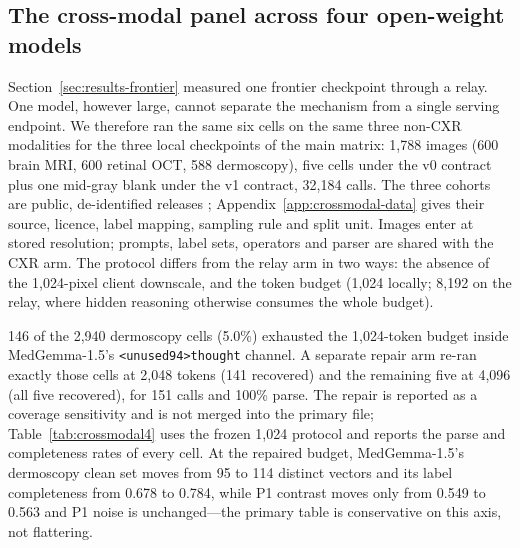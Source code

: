 \subsection{The cross-modal panel across four open-weight models}
\label{sec:results-crossmodal}

Section~\ref{sec:results-frontier} measured one frontier checkpoint through a relay. One
model, however large, cannot separate the mechanism from a single serving endpoint. We
therefore ran the same six cells on the same three non-CXR modalities for the three local
checkpoints of the main matrix: 1,788 images (600 brain MRI, 600 retinal OCT, 588
dermoscopy), five cells under the v0 contract plus one mid-gray blank under the v1
contract, 32,184 calls. The three cohorts are public, de-identified releases
\citep{cheng2017braintumor,kermany2018identifying,tschandl2018ham10000}; Appendix~\ref{app:crossmodal-data}
gives their source, licence, label mapping, sampling rule and split unit. Images enter at
stored resolution; prompts, label sets, operators
and parser are shared with the CXR arm. The protocol differs from the relay arm in two
ways: the absence of the 1,024-pixel client downscale, and the token budget (1,024
locally; 8,192 on the relay, where hidden reasoning otherwise consumes the whole budget).

146 of the 2,940 dermoscopy cells (5.0\%) exhausted the 1,024-token budget inside
MedGemma-1.5's \texttt{<unused94>thought} channel. A separate repair arm re-ran exactly
those cells at 2,048 tokens (141 recovered) and the remaining five at 4,096 (all five
recovered), for 151 calls and 100\% parse. The repair is reported as a coverage
sensitivity and is not merged into the primary file; Table~\ref{tab:crossmodal4} uses the
frozen 1,024 protocol and reports the parse and completeness rates of every cell. At the
repaired budget, MedGemma-1.5's dermoscopy clean set moves from 95 to 114 distinct vectors
and its label completeness from 0.678 to 0.784, while P1 contrast moves only from 0.549 to
0.563 and P1 noise is unchanged---the primary table is conservative on this axis, not
flattering.

